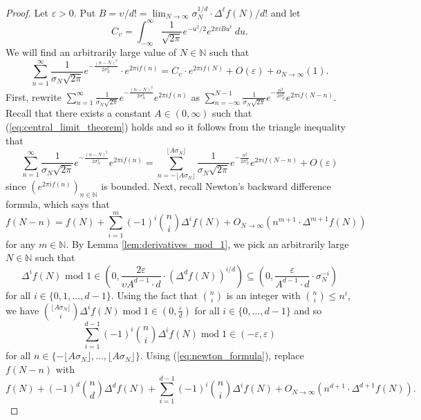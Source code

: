 \documentclass[12pt]{article}
\theoremstyle{plain} %
\theoremstyle{definition} %
\theoremstyle{plain}
\theoremstyle{plain}
\numberwithin{equation}{section}
\newcommand{\N}{\mathbb{N}}
\renewcommand{\epsilon}{\varepsilon}
\renewcommand{\leq}{\leqslant}
\newcommand{\1}{\mathbbm{1}}
\newcommand{\oo}{\infty}
\renewcommand{\mod}{\operatorname{mod}}
\begin{document}
\begin{proof}

Let $\epsilon>0$. Put $B = \upsilon/d! = \lim_{N\to\oo}\sigma_N^{1/d}\cdot \Delta^{\ell}f(N)/d!$ and let 
\[
C_{\upsilon} =  \int_{-\oo}^{\oo} \frac{1}{\sqrt{2\pi}}e^{-u^2/2}e^{2\pi i Bu^{\ell}}~du.
\]
We will find an arbitrarily large value of $N\in \N$ such that 
\[
    \sum_{n=1}^{\oo}\frac{1}{\sigma_N\sqrt{2\pi}}e^{-\frac{(n-N)^2}{2\sigma_N^2}}\cdot e^{2\pi i f(n)} = C_{\upsilon}\cdot e^{2\pi i f(N)}+O(\epsilon)+o_{N\to\oo}(1).
\]
First, rewrite $ \sum_{n=1}^{\oo}\frac{1}{\sigma_N\sqrt{2\pi}}e^{-\frac{(n-N)^2}{2\sigma_N^2}} e^{2\pi i f(n)}$ as $\sum_{n=-\oo}^{N-1}\frac{1}{\sigma_N\sqrt{2\pi}}e^{-\frac{n^2}{2\sigma_N^2}} e^{2\pi i f(N-n)}$. Recall that there exists a constant $A\in (0,\oo)$ such that (\ref{eq:central_limit_theorem}) holds and so it follows from the triangle inequality that
\begin{equation}\label{eq:post_triangle_inequality}
      \sum_{n=1}^{\oo}\frac{1}{\sigma_N\sqrt{2\pi}}e^{-\frac{(n-N)^2}{2\sigma_N^2}} e^{2\pi i f(n)} =  \sum_{n=-\lfloor{A\sigma_N\rfloor}}^{\lfloor  A \sigma_N\rfloor}\frac{1}{\sigma_N\sqrt{2\pi}}e^{-\frac{n^2}{2\sigma_N^2}}e^{2\pi i f(N-n)}+O(\epsilon)
\end{equation}
since $(e^{2\pi i f(n)})_{n\in \N}$ is bounded. Next, recall Newton's backward difference formula, which says that
\begin{equation}\label{eq:newton_formula}
    f(N-n) = f(N)+
    \sum_{i=1}^{m} (-1)^i\binom{n}{i}\Delta^{i}f(N)+O_{N\to\oo}(n^{m+1}\cdot \Delta^{m+1}f(N))
\end{equation}
for any $m\in \N$. By Lemma \ref{lem:derivatives_mod_1}, we pick an arbitrarily large $N\in \N$ such that 
\[
\Delta^{i}f(N)\text{ mod } 1\in (0,\frac{2\epsilon}{\upsilon A^{d-1}\cdot d}\cdot (\Delta ^{d}f(N))^{i/d})\subseteq (0,\frac{\epsilon}{A^{d-1}\cdot d}\cdot\sigma_N^{-i})
\]
for all $i\in\{0,1,\dots, d-1\}$. Using the fact that $\binom{n}{i}$ is an integer with $\binom{n}{i}\leq  n^i$, we have $\binom{\lfloor A\sigma_N\rfloor}{i}\Delta^{i}f(N)\mod 1 \in (0,\frac{\epsilon}{d})$ for all $i\in \{0,\dots, d-1\}$ and so 
\begin{equation}\label{eq:small_sum_mod_1}
\sum_{i=1}^{d-1} (-1)^i\binom{n}{i}\Delta^{i}f(N)\mod 1 \in (-\epsilon,\epsilon)
\end{equation}
for all $n\in \{-\lfloor A\sigma_N \rfloor, \dots, \lfloor A\sigma_N \rfloor\}$. Using (\ref{eq:newton_formula}), replace $f(N-n)$ with 
\[
f(N)+(-1)^{d}\binom{n}{d}\Delta^{d}f(N)+\sum_{i=1}^{d-1} (-1)^i\binom{n}{i}\Delta^{i}f(N)+O_{N\to\oo}(n^{d+1}\cdot \Delta^{d+1}f(N)).
\]
\end{proof}
\end{document}
